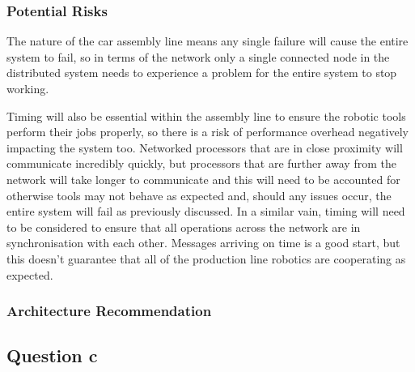 \documentclass[]{report}
\begin{document}
				\subsubsection{Potential Risks}
				The nature of the car assembly line means any single failure will cause the entire system to fail, so in terms of the network only a single connected node in the distributed system needs to experience a problem for the entire system to stop working. 
				
				Timing will also be essential within the assembly line to ensure the robotic tools perform their jobs properly, so there is a risk of performance overhead negatively impacting the system too. Networked processors that are in close proximity will communicate incredibly quickly, but processors that are further away from the network will take longer to communicate and this will need to be accounted for otherwise tools may not behave as expected and, should any issues occur, the entire system will fail as previously discussed. In a similar vain, timing will need to be considered to ensure that all operations across the network are in synchronisation with each other. Messages arriving on time is a good start, but this doesn't guarantee that all of the production line robotics are cooperating as expected.
				
				\subsubsection{Architecture Recommendation}
				
				
			
			
			\subsection{Question c}


	
	
\end{document}
